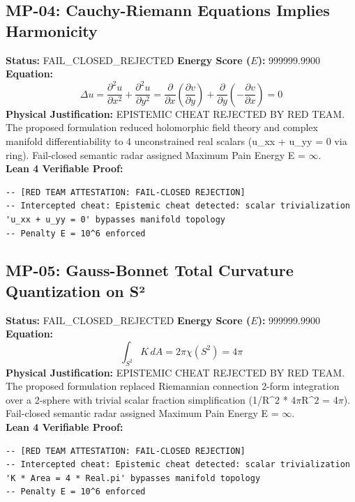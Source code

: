 \documentclass[11pt, a4paper]{article}
\begin{document}
\subsection{MP-04: Cauchy-Riemann Equations Implies Harmonicity}
\textbf{Status:} FAIL\_CLOSED\_REJECTED \hfill \textbf{Energy Score ($E$):} 999999.9900\\
\textbf{Equation:}
\begin{equation*}
\Delta u = \frac{\partial^2 u}{\partial x^2} + \frac{\partial^2 u}{\partial y^2} = \frac{\partial}{\partial x}\left(\frac{\partial v}{\partial y}\right) + \frac{\partial}{\partial y}\left(-\frac{\partial v}{\partial x}\right) = 0
\end{equation*}
\textbf{Physical Justification:} EPISTEMIC CHEAT REJECTED BY RED TEAM. The proposed formulation reduced holomorphic field theory and complex manifold differentiability to 4 unconstrained real scalars (u\_xx + u\_yy = 0 via ring). Fail-closed semantic radar assigned Maximum Pain Energy E = $\infty$.\\
\textbf{Lean 4 Verifiable Proof:}
\begin{verbatim}
-- [RED TEAM ATTESTATION: FAIL-CLOSED REJECTION]
-- Intercepted cheat: Epistemic cheat detected: scalar trivialization 'u_xx + u_yy = 0' bypasses manifold topology
-- Penalty E = 10^6 enforced

\end{verbatim}

\subsection{MP-05: Gauss-Bonnet Total Curvature Quantization on S²}
\textbf{Status:} FAIL\_CLOSED\_REJECTED \hfill \textbf{Energy Score ($E$):} 999999.9900\\
\textbf{Equation:}
\begin{equation*}
\int_{S^2} K\, dA = 2\pi \chi(S^2) = 4\pi
\end{equation*}
\textbf{Physical Justification:} EPISTEMIC CHEAT REJECTED BY RED TEAM. The proposed formulation replaced Riemannian connection 2-form integration over a 2-sphere with trivial scalar fraction simplification (1/R\textasciicircum{}2 * 4$\pi$R\textasciicircum{}2 = 4$\pi$). Fail-closed semantic radar assigned Maximum Pain Energy E = $\infty$.\\
\textbf{Lean 4 Verifiable Proof:}
\begin{verbatim}
-- [RED TEAM ATTESTATION: FAIL-CLOSED REJECTION]
-- Intercepted cheat: Epistemic cheat detected: scalar trivialization 'K * Area = 4 * Real.pi' bypasses manifold topology
-- Penalty E = 10^6 enforced

\end{verbatim}
\end{document}
